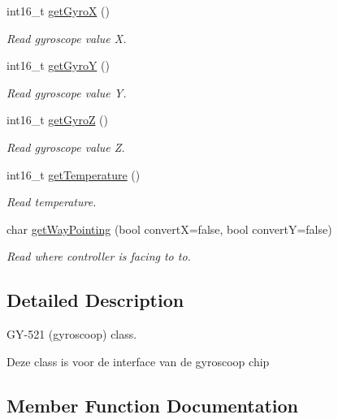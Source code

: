 \begin{DoxyCompactItemize}
int16\+\_\+t \hyperlink{classmcbelib_1_1gy521_a1145cda6295287a6cda950c156bcf0d9}{get\+GyroX} ()
\begin{DoxyCompactList}\small\item\em Read gyroscope value X. \end{DoxyCompactList}\item 
int16\+\_\+t \hyperlink{classmcbelib_1_1gy521_a8b9cec4004f71c70c3a14b5f6fbf9e4d}{get\+GyroY} ()
\begin{DoxyCompactList}\small\item\em Read gyroscope value Y. \end{DoxyCompactList}\item 
int16\+\_\+t \hyperlink{classmcbelib_1_1gy521_a197222a217acdbf8260e9495120497a0}{get\+GyroZ} ()
\begin{DoxyCompactList}\small\item\em Read gyroscope value Z. \end{DoxyCompactList}\item 
int16\+\_\+t \hyperlink{classmcbelib_1_1gy521_abb1275aa14cf35844900e91fded2bad0}{get\+Temperature} ()
\begin{DoxyCompactList}\small\item\em Read temperature. \end{DoxyCompactList}\item 
char \hyperlink{classmcbelib_1_1gy521_af0d109f92f90dd9c4ae28c6fdacd9a88}{get\+Way\+Pointing} (bool convertX=false, bool convertY=false)
\begin{DoxyCompactList}\small\item\em Read where controller is facing to to. \end{DoxyCompactList}\end{DoxyCompactItemize}


\subsection{Detailed Description}
G\+Y-\/521 (gyroscoop) class. 

Deze class is voor de interface van de gyroscoop chip 

\subsection{Member Function Documentation}
\mbox{\label{classmcbelib_1_1gy521_a3d894d6a553ab6ed660886c349f2f7bf}} 
